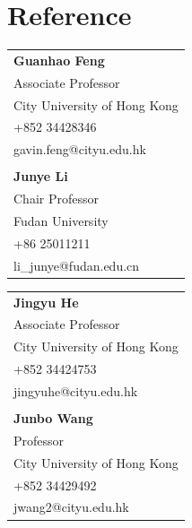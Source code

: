 \documentclass{clean_cv}
\begin{document}
\section{Reference}

\hspace{3cm} \begin{tabular}{l}
	
	\textbf{Guanhao Feng}                            \\
	Associate Professor                                  \\
	City University of Hong Kong                \\
	+852 34428346                                      \\
	gavin.feng@cityu.edu.hk                       \\
	
	\\
	
	\textbf{Junye Li}                                   \\
	Chair Professor                                                \\
	Fudan University                                   \\
	+86 25011211                                        \\
	li\_junye@fudan.edu.cn                        \\
	
\end{tabular} \hspace{3cm} \begin{tabular}{l}
	
	\textbf{Jingyu He}                                   \\
	Associate Professor                                \\
	City University of Hong Kong              \\
	+852 34424753                                    \\
	jingyuhe@cityu.edu.hk                         \\
	
	\\
	
	\textbf{Junbo Wang}                              \\
	Professor                                                 \\
	City University of Hong Kong                \\
	+852 34429492                                      \\
	jwang2@cityu.edu.hk                            \\
	
\end{tabular} 
\end{document}
